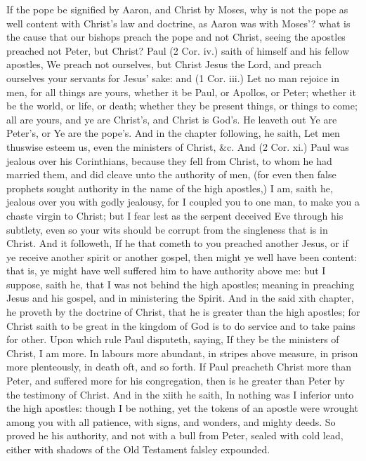 If the pope be signified by Aaron, and Christ by Moses, 
why is not the pope as well content with Christ's law and 
doctrine, as Aaron was with Moses'? what is the cause 
that our bishops preach the pope and not Christ, seeing 
the apostles preached not Peter, but Christ? Paul (2 
Cor. iv.) saith of himself and his fellow apostles, We 
preach not ourselves, but Christ Jesus the Lord, and preach 
ourselves your servants for Jesus' sake: and (1 Cor. iii.) 
Let no man rejoice in men, for all things are yours, whether 
it be Paul, or Apollos, or Peter; whether it be the world, 
or life, or death; whether they be present things, or things 
to come; all are yours, and ye are Christ's, and 
Christ is God's. He leaveth out Ye are Peter's, or Ye are 
the pope's. And in the chapter following, he saith, Let men 
thuswise esteem us, even the ministers of Christ, \&c. And 
(2 Cor. xi.) Paul was jealous over his Corinthians, because 
they fell from Christ, to whom he had married them, and 
did cleave unto the authority of men, (for even then false 
prophets sought authority in the name of the high apostles,) 
I am, saith he, jealous over you with godly jealousy, for I 
coupled you to one man, to make you a chaste virgin to 
Christ; but I fear lest as the serpent deceived Eve 
through his subtlety, even so your wits should be corrupt 
from the singleness that is in Christ. And it followeth, If 
he that cometh to you preached another Jesus, or if ye receive
another spirit or another gospel, then might ye well 
have been content: that is, ye might have well suffered him 
to have authority above me: but I suppose, saith he, that 
I was not behind the high apostles; meaning in preaching 
Jesus and his gospel, and in ministering the Spirit. And 
in the said xith chapter, he proveth by the doctrine of 
Christ, that he is greater than the high apostles; for Christ 
saith to be great in the kingdom of God is to do service 
and to take pains for other. Upon which rule Paul disputeth,
saying, If they be the ministers of Christ, I am more. 
In labours more abundant, in stripes above measure, in 
prison more plenteously, in death oft, and so forth. If Paul 
preacheth Christ more than Peter, and suffered more for 
his congregation, then is he greater than Peter by the testimony
of Christ. And in the xiith he saith, In nothing was 
I inferior unto the high apostles: though I be nothing, yet 
the tokens of an apostle were wrought among you with all 
patience, with signs, and wonders, and mighty deeds. So 
proved he his authority, and not with a bull from Peter, 
sealed with cold lead, either with shadows of the Old Testament
falsley expounded. 

